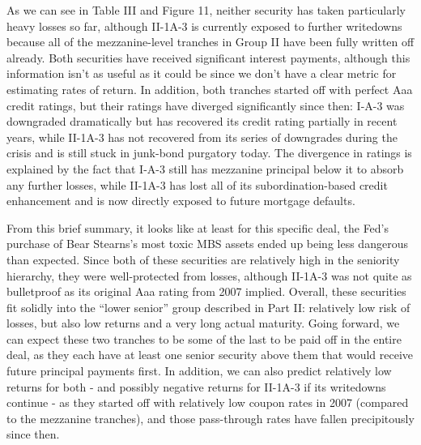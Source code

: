 \documentclass[12pt]{article}
\begin{document}
As we can see in Table III and Figure 11, neither security has taken particularly heavy losses so far, although II-1A-3 is currently exposed to further writedowns because all of the mezzanine-level tranches in Group II have been fully written off already. Both securities have received significant interest payments, although this information isn’t as useful as it could be since we don’t have a clear metric for estimating rates of return. In addition, both tranches started off with perfect Aaa credit ratings, but their ratings have diverged significantly since then: I-A-3 was downgraded dramatically but has recovered its credit rating partially in recent years, while II-1A-3 has not recovered from its series of downgrades during the crisis and is still stuck in junk-bond purgatory today. The divergence in ratings is explained by the fact that I-A-3 still has mezzanine principal below it to absorb any further losses, while II-1A-3 has lost all of its subordination-based credit enhancement and is now directly exposed to future mortgage defaults.

From this brief summary, it looks like at least for this specific deal, the Fed’s purchase of Bear Stearns’s most toxic MBS assets ended up being less dangerous than expected. Since both of these securities are relatively high in the seniority hierarchy, they were well-protected from losses, although II-1A-3 was not quite as bulletproof as its original Aaa rating from 2007 implied. Overall, these securities fit solidly into the “lower senior” group described in Part II: relatively low risk of losses, but also low returns and a very long actual maturity. Going forward, we can expect these two tranches to be some of the last to be paid off in the entire deal, as they each have at least one senior security above them that would receive future principal payments first. In addition, we can also predict relatively low returns for both - and possibly negative returns for II-1A-3 if its writedowns continue - as they started off with relatively low coupon rates in 2007 (compared to the mezzanine tranches), and those pass-through rates have fallen precipitously since then.
\end{document}
